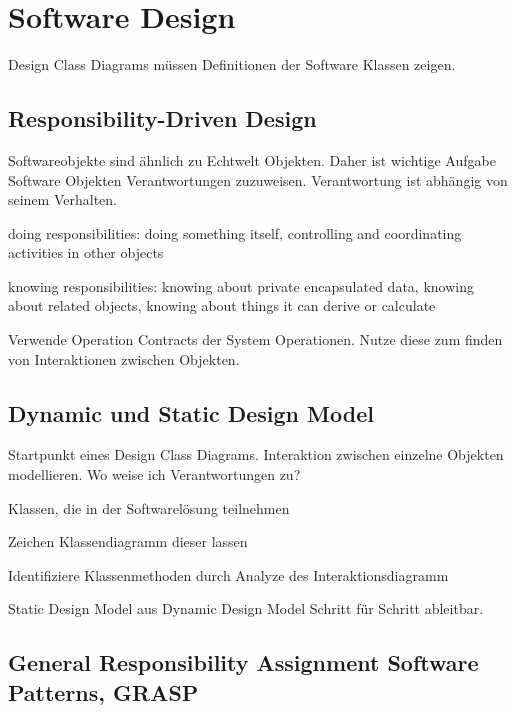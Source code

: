 \chapter{Software Design}
Design Class Diagrams müssen Definitionen der Software Klassen zeigen.

\section{Responsibility-Driven Design}

Softwareobjekte sind ähnlich zu Echtwelt Objekten. Daher ist wichtige Aufgabe Software Objekten
Verantwortungen zuzuweisen. Verantwortung ist abhängig von seinem Verhalten.
\begin{compactitem}
    \item doing responsibilities: doing something itself, controlling and coordinating activities
    in other objects
    \item knowing responsibilities: knowing about private encapsulated data, knowing about related
    objects, knowing about things it can derive or calculate
\end{compactitem}

Verwende Operation Contracts der System Operationen. Nutze diese zum finden von Interaktionen zwischen
Objekten.

\section{Dynamic und Static Design Model}

Startpunkt eines Design Class Diagrams.
Interaktion zwischen einzelne Objekten modellieren. Wo weise ich Verantwortungen zu?
\begin{compactenum}
    \item Klassen, die in der Softwarelösung teilnehmen
    \item Zeichen Klassendiagramm dieser lassen
    \item Identifiziere Klassenmethoden durch Analyze des Interaktionsdiagramm
\end{compactenum}

Static Design Model aus Dynamic Design Model Schritt für Schritt ableitbar.

\section{General Responsibility Assignment Software Patterns, GRASP}

